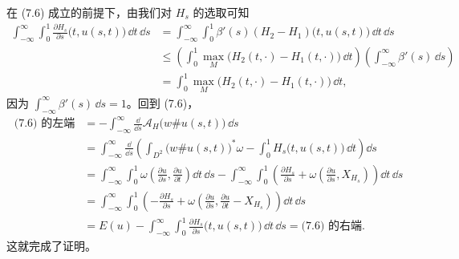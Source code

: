 \begin{wproof}
  在 (7.6) 成立的前提下，由我们对 $H_s$ 的选取可知
  \begin{align*}
    \int_{-\infty}^{\infty}\!\!\int_0^1
    \frac{\partial H_s}{\partial s}\bigl(t,u(s,t)\bigr)\,\dd t\,\dd s
    &=\int_{-\infty}^{\infty}\!\!\int_0^1
      \beta'(s)(H_2-H_1)\bigl(t,u(s,t)\bigr)\,\dd t\,\dd s\\
    &\le\left(\int_0^1\max_M\bigl(H_2(t,\cdot)-H_1(t,\cdot)\bigr)\,\dd t\right)
      \left(\int_{-\infty}^{\infty}\beta'(s)\,\dd s\right)\\
    &=\int_0^1\max_M\bigl(H_2(t,\cdot)-H_1(t,\cdot)\bigr)\,\dd t,
  \end{align*}
  因为 $\int_{-\infty}^{\infty}\beta'(s)\,\dd s=1$。回到 (7.6)，
  \begin{align*}
    \text{(7.6) 的左端}
    &=-\int_{-\infty}^{\infty}\frac{\dd}{\dd s}
      \mathcal{A}_H\bigl(w\#u(s,t)\bigr)\,\dd s\\
    &=\int_{-\infty}^{\infty}\frac{\dd}{\dd s}\left(
      \int_{D^2}\bigl(w\#u(s,t)\bigr)^*\omega
      -\int_0^1 H_s\bigl(t,u(s,t)\bigr)\,\dd t\right)\dd s\\
    &=\int_{-\infty}^{\infty}\!\!\int_0^1
      \omega\left(\frac{\partial u}{\partial s},\frac{\partial u}{\partial t}\right)
      \dd t\,\dd s
      -\int_{-\infty}^{\infty}\!\!\int_0^1\left(
      \frac{\partial H_s}{\partial s}
      +\omega\left(\frac{\partial u}{\partial s},X_{H_s}\right)\right)\dd t\,\dd s\\
    &=\int_{-\infty}^{\infty}\!\!\int_0^1\left(
      -\frac{\partial H_s}{\partial s}
      +\omega\left(\frac{\partial u}{\partial s},
      \frac{\partial u}{\partial t}-X_{H_s}\right)\right)\dd t\,\dd s\\
    &=E(u)-\int_{-\infty}^{\infty}\!\!\int_0^1
       \frac{\partial H_s}{\partial s}\bigl(t,u(s,t)\bigr)\,\dd t\,\dd s
      =\text{(7.6) 的右端}.
  \end{align*}
  这就完成了证明。
\end{wproof}


